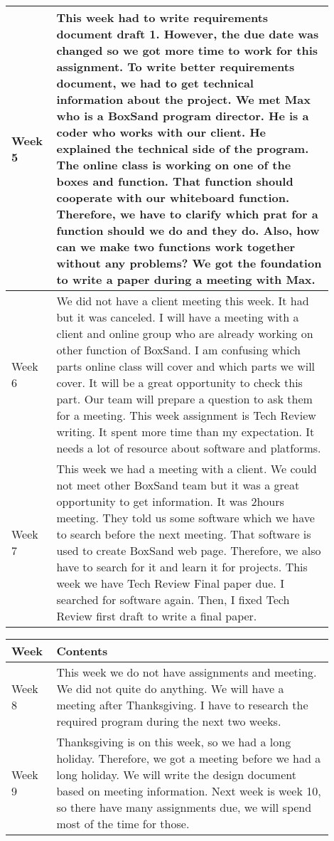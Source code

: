 \documentclass[10pt]{article}
\begin{document}
\begin{center}
\begin{tabular}{ | p{0.1\linewidth} | p{0.8\linewidth} | }
                Week 5 & This week had to write requirements document draft 1. However, the due date was changed so we got more time to work for this assignment. To write better requirements document, we had to get technical information about the project. We met Max who is a BoxSand program director. He is a coder who works with our client. He explained the technical side of the program. The online class is working on one of the boxes and function. That function should cooperate with our whiteboard function. Therefore, we have to clarify which prat for a function should we do and they do. Also, how can we make two functions work together without any problems? We got the foundation to write a paper during a meeting with Max.  \\ \hline
                Week 6 & We did not have a client meeting this week. It had but it was canceled. I will have a meeting with a client and online group who are already working on other function of BoxSand. I am confusing which parts online class will cover and which parts we will cover. It will be a great opportunity to check this part. Our team will prepare a question to ask them for a meeting. This week assignment is Tech Review writing. It spent more time than my expectation. It needs a lot of resource about software and platforms.  \\ \hline
                Week 7 & This week we had a meeting with a client. We could not meet other BoxSand team but it was a great opportunity to get information. It was 2hours meeting. They told us some software which we have to search before the next meeting. That software is used to create BoxSand web page. Therefore, we also have to search for it and learn it for projects. This week we have Tech Review Final paper due. I searched for software again. Then, I fixed Tech Review first draft to write a final paper.  \\ \hline
            \end{tabular}

            \begin{tabular}{ | p{0.1\linewidth} | p{0.8\linewidth} | } \hline
                Week & Contents  \\ \hline
                Week 8 & This week we do not have assignments and meeting. We did not quite do anything. We will have a meeting after Thanksgiving. I have to research the required program during the next two weeks.  \\ \hline
                Week 9 & Thanksgiving is on this week, so we had a long holiday. Therefore, we got a meeting before we had a long holiday. We will write the design document based on meeting information. Next week is week 10, so there have many assignments due, we will spend most of the time for those.  \\ \hline
            \end{tabular}
            \end{center}
\end{document}
